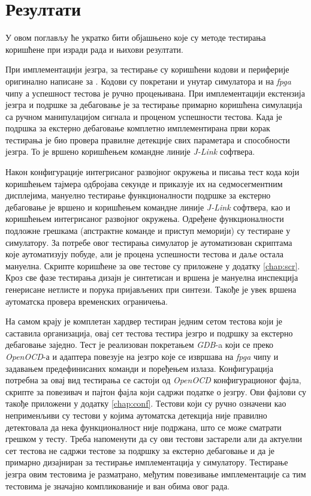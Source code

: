 \chapter{Резултати}

У овом поглављу ће укратко бити објашњено које су методе тестирања коришћене при изради рада и њихови резултати.

При имплементацији језгра, за тестирање су коришћени кодови и периферије оригинално написане за \cite{arilla}. Кодови су покретани и унутар симулатора и на \textit{\acrshort{fpga}} чипу а успешност тестова је ручно процењивана.
При имплементацији екстензија језгра и подршке за дебаговање је за тестирање примарно коришћена симулација са ручном манипулацијом сигнала и проценом успешности тестова.
Када је подршка за екстерно дебаговање комплетно имплементирана први корак тестирања је био провера правилне детекције свих параметара и способности језгра. То је вршено коришћењем командне линије \textit{J-Link} софтвера.

\newpage

Након конфигурације интегрисаног развојног окружења и писања тест кода који коришћењем тајмера одбројава секунде и приказује их на седмосегментним дисплејима, мануелно тестирање функционалности подршке за екстерно дебаговање је вршено и коришћењем командне линије \textit{J-Link} софтвера, као и коришћењем интегрисаног развојног окружења.
Одређене функционалности подложне грешкама (апстрактне команде и приступ меморији) су тестиране у симулатору. За потребе овог тестирања симулатор је аутоматизован скриптама које аутоматизују побуде, али је процена успешности тестова и даље остала мануелна. Скрипте коришћене за ове тестове су приложене у додатку \ref{chap:scr}.
Кроз све фазе тестирања дизајн је синтетисан и вршена је мануелна инспекција генерисане нетлисте и порука пријављених при синтези. Такође је увек вршена аутоматска провера временских ограничења.

На самом крају је комплетан хардвер тестиран једним сетом тестова који је саставила  организација, овај сет тестова тестира језгро и подршку за екстерно дебаговање заједно.
Тест је реализован покретањем \textit{\acrshort{GDB}}-a који се преко \textit{Open\acrshort{OCD}}-а и адаптера повезује на језгро које се извршава на \textit{\acrshort{fpga}} чипу и задавањем предефинисаних команди и поређењем излаза. Конфигурација потребна за овај вид тестирања се састоји од \textit{Open\acrshort{OCD}} конфигурационог фајла, скрипте за повезивач и пајтон фајла који садржи податке о језгру. Ови фајлови су такође приложени у додатку \ref{chap:conf}. Тестови који су ручно означени као неприменљиви су тестови у којима аутоматска детекција није правилно детектовала да нека функционалност није подржана, што се може сматрати грешком у тесту. Треба напоменути да су ови тестови застарели али да актуелни сет тестова не садржи тестове за подршку за екстерно дебаговање и да је примарно дизајниран за тестирање имплементација у симулатору. Тестирање језгра овим тестовима је разматрано, међутим повезивање имплементације са тим тестовима је значајно компликованије и ван обима овог рада.

